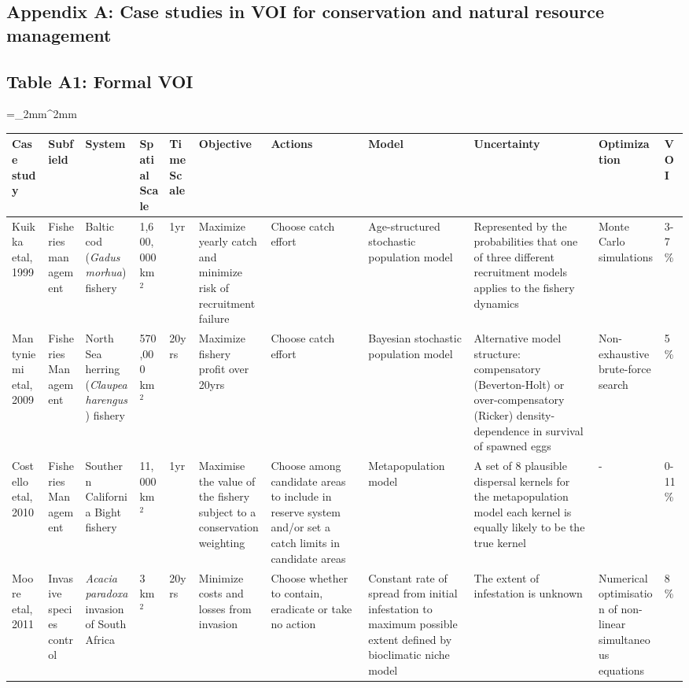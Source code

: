 \newpage
\begin{landscape}
\section*{Appendix A: Case studies in VOI for conservation and natural resource management}

\subsection*{Table A1: Formal VOI}
\bgroup
\linespread{1}\scriptsize
\extrarowsep=_2mm^2mm
\begin{longtabu} to 230mm {|X[1,l] X[1,l] X[1,l] X[1,l] X[.8,l] X[1,l] X[1,l] X[1,l] X[1,l] X[1,l] X[1,l]|} \hline 
Case study & Subfield & System & Spatial Scale & Time Scale & Objective & Actions & Model & Uncertainty & Optimization & VOI \\ \hline
Kuikka etal, 1999 & Fisheries management & Baltic cod (\textit{Gadus morhua}) fishery & 1,600,000 km$^2$ & 1yr & Maximize yearly catch and minimize risk of recruitment failure & Choose catch effort & Age-structured stochastic population model & Represented by the probabilities that one of three different recruitment models applies to the fishery dynamics & Monte Carlo simulations & 3-7\% \\
Mantyniemi etal, 2009 & Fisheries Management & North Sea herring (\textit{Claupea harengus}) fishery & 570,000 km$^2$ & 20yrs & Maximize fishery profit over 20yrs & Choose catch effort & Bayesian stochastic population model & Alternative model structure: compensatory (Beverton-Holt) or over-compensatory (Ricker) density-dependence in survival of spawned eggs & Non-exhaustive brute-force search & 5\% \\
Costello etal, 2010 & Fisheries Management & Southern California Bight fishery & 11,000 km$^2$ & 1yr & Maximise the value of the fishery subject to a conservation weighting & Choose among candidate areas to include in reserve system and/or set a catch limits in candidate areas  & Metapopulation model & A set of 8 plausible dispersal kernels for the metapopulation model each kernel is equally likely to be the true kernel & - & 0-11\% \\
Moore etal, 2011 & Invasive species control & \textit{Acacia paradoxa} invasion of South Africa & 3 km$^2$ & 20yrs & Minimize costs and losses from invasion & Choose whether to contain, eradicate or take no action & Constant rate of spread from initial infestation to maximum possible extent defined by bioclimatic niche model & The extent of infestation is unknown & Numerical optimisation of non-linear simultaneous equations & 8\% \\

\end{longtabu}
\end{landscape}
